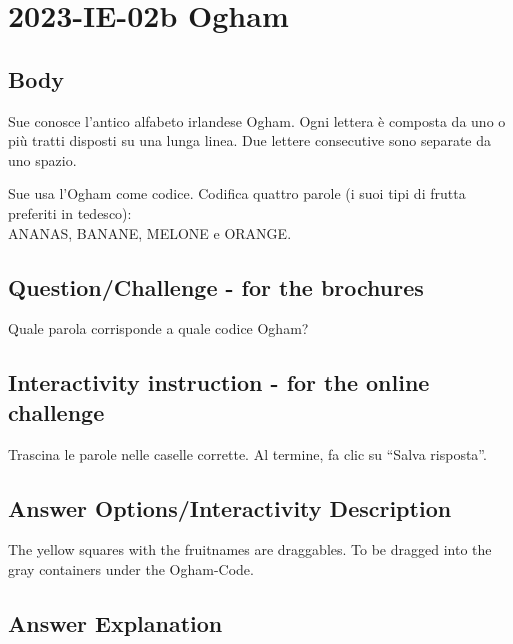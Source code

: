 \documentclass[a4paper,11pt]{report}
\newcommand{\taskGraphicsFolder}{..}
\begin{document}
\section*{\centering{} 2023-IE-02b Ogham}


\subsection*{Body}

Sue conosce l’antico alfabeto irlandese Ogham.
Ogni lettera è composta da uno o più tratti disposti su una lunga linea.
Due lettere consecutive sono separate da uno spazio.

Sue usa l’Ogham come codice.  Codifica quattro parole (i suoi tipi di frutta preferiti in tedesco): \\
ANANAS, BANANE, MELONE e ORANGE.

{\em


\subsection*{Question/Challenge - for the brochures}

Quale parola corrisponde a quale codice Ogham?

{\centering%
\par}

}


\subsection*{Interactivity instruction - for the online challenge}

Trascina le parole nelle caselle corrette. Al termine, fa clic su \enquote{Salva risposta}.

\begingroup
\renewcommand{\arraystretch}{1.5}
\subsection*{Answer Options/Interactivity Description}

The yellow squares with the fruitnames are draggables. To be dragged into the gray containers under the Ogham-Code.

\endgroup

\subsection*{Answer Explanation}
\end{document}
